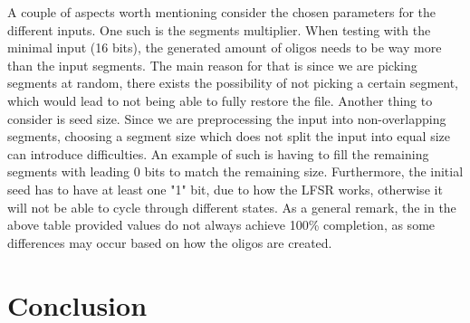 \documentclass[12pt]%
{article}
\begin{document}
A couple of aspects worth mentioning consider the chosen parameters for the different inputs. One such is the segments multiplier. When testing with the minimal input (16 bits), the generated amount of oligos needs to be way more than the input segments. The main reason for that is since we are picking segments at random, there exists the possibility of not picking a certain segment, which would lead to not being able to fully restore the file. Another thing to consider is seed size. Since we are preprocessing the input into non-overlapping segments, choosing a segment size which does not split the input into equal size can introduce difficulties. An example of such is having to fill the remaining segments with leading 0 bits to match the remaining size. Furthermore, the initial seed has to have at least one "1" bit, due to how the LFSR works, otherwise it will not be able to cycle through different states. As a general remark, the in the above table provided values do not always achieve 100\% completion, as some differences may occur based on how the oligos are created. 


\newpage
\newpage
\section{Conclusion}
\end{document}
